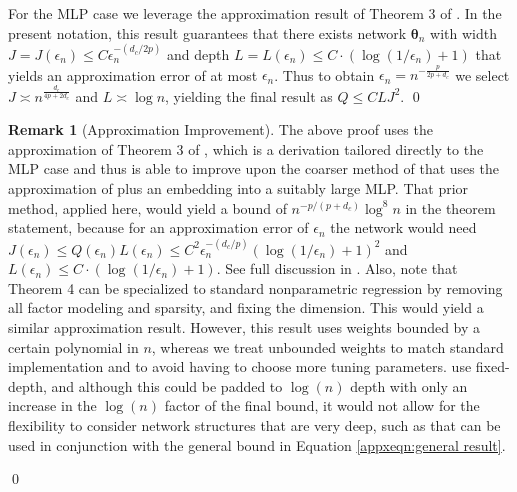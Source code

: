 \documentclass[12pt]{article}
\numberwithin{equation}{section}
\theoremstyle{definition}
\newtheorem{remarkTmp}{Remark}
\newenvironment{remark}
	{\medskip  \begin{remarkTmp} 	}
	{ 
		\renewcommand{\qedsymbol}{$\clubsuit$}
		\qed 
		\end{remarkTmp} 
	}
\newcommand{\btheta}{\boldsymbol{\theta}}
\newcommand{\dc}{d_c}  %
\begin{document}
\begin{appendices}
For the MLP case we leverage the approximation result of Theorem 3 of \cite{Tang2025_WP}. In the present notation, this result guarantees that there exists network $\btheta_n$ with width $J = J(\epsilon_n)  \leq C \epsilon_n^{-(\dc/2p)} $ and depth $L=L(\epsilon_n) \leq C \cdot ( \log (1/\epsilon_n) + 1)$ that yields an approximation error of at most $\epsilon_n$. Thus to obtain $\epsilon_n = n^{-\frac{p}{2 p+\dc}}$ we select $J \asymp  n^{\frac{\dc}{4p + 2\dc}} $ and $L \asymp \log n$, yielding the final result as $Q \leq C L J^2$. \qed 





\begin{remark}[Approximation Improvement]
    \label{appxrem:approximation}
    The above proof uses the approximation of Theorem 3 of \cite{Tang2025_WP}, which is a derivation tailored directly to the MLP case and thus is able to improve upon the coarser method of \cite{Farrell-Liang-Misra2021_Ecma} that uses the approximation of \cite{Yarotsky2017_NN} plus an embedding into a suitably large MLP. That prior method, applied here, would yield a bound of $n^{-p/(p+\dc)} \log^8 n$ in the theorem statement, because for an approximation error of $\epsilon_n$ the network would need $J(\epsilon_n) \leq Q(\epsilon_n) L(\epsilon_n) \leq C^2  \epsilon_n^{-(\dc/p)} ( \log (1/\epsilon_n) + 1)^2$ and $ L(\epsilon_n) \leq C \cdot ( \log (1/\epsilon_n) + 1)$. See full discussion in \cite{Tang2025_WP}. Also, note that \cite{Fan-Gu2024_JASA} Theorem 4 can be specialized to standard nonparametric regression by removing all factor modeling and sparsity, and fixing the dimension. This would yield a similar approximation result. However, this result uses weights bounded by a certain polynomial in $n$, whereas we treat unbounded weights to match standard implementation and to avoid having to choose more tuning parameters. \cite{Fan-Gu2024_JASA} use fixed-depth, and although this could be padded to $\log(n)$ depth with only an increase in the $\log(n)$ factor of the final bound, it would not allow for the flexibility to consider network structures that are very deep, such as \cite{Yarotsky2018_COLT,Hanin2019_Mathematics,Farrell-Liang-Misra2021_Ecma} that can be used in conjunction with the general bound in Equation \eqref{appxeqn:general result}.
\end{remark}










\end{appendices}
\end{document}
